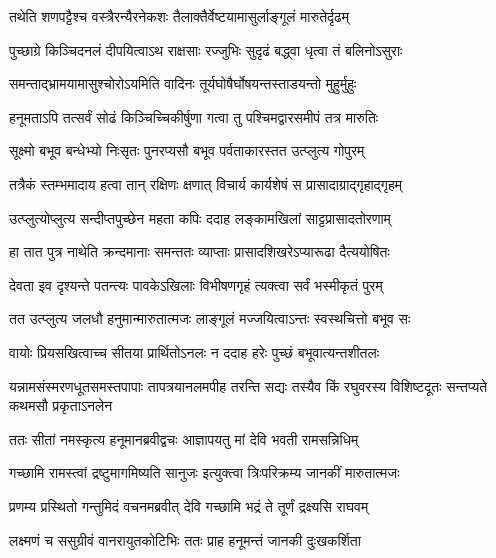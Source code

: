 \twolineshloka
{तथेति शणपट्टैश्च वस्त्रैरन्यैरनेकशः}
{तैलाक्तैर्वेष्टयामासुर्लाङ्गूलं मारुतेर्दृढम्} %

\twolineshloka
{पुच्छाग्रे किञ्चिदनलं दीपयित्वाऽथ राक्षसाः}
{रज्जुभिः सुदृढं बद्ध्वा धृत्वा तं बलिनोऽसुराः} %

\twolineshloka
{समन्ताद्भ्रामयामासुश्चोरोऽयमिति वादिनः}
{तूर्यघोषैर्घोषयन्तस्ताडयन्तो मुहुर्मुहुः} %

\twolineshloka
{हनूमताऽपि तत्सर्वं सोढं किञ्चिच्चिकीर्षुणा}
{गत्वा तु पश्चिमद्वारसमीपं तत्र मारुतिः} %

\twolineshloka
{सूक्ष्मो बभूव बन्धेभ्यो निःसृतः पुनरप्यसौ}
{बभूव पर्वताकारस्तत उत्प्लुत्य गोपुरम्} %

\twolineshloka
{तत्रैकं स्तम्भमादाय हत्वा तान् रक्षिणः क्षणात्}
{विचार्य कार्यशेषं स प्रासादाग्राद्गृहाद्गृहम्} %

\twolineshloka
{उत्प्लुत्योप्लुत्य सन्दीप्तपुच्छेन महता कपिः}
{ददाह लङ्कामखिलां साट्टप्रासादतोरणाम्} %

\twolineshloka
{हा तात पुत्र नाथेति क्रन्दमानाः समन्ततः}
{व्याप्ताः प्रासादशिखरेऽप्यारूढा दैत्ययोषितः} %

\twolineshloka
{देवता इव दृश्यन्ते पतन्त्यः पावकेऽखिलाः}
{विभीषणगृहं त्यक्त्वा सर्वं भस्मीकृतं पुरम्} %

\twolineshloka
{तत उत्प्लुत्य जलधौ हनुमान्मारुतात्मजः}
{लाङ्गूलं मज्जयित्वाऽन्तः स्वस्थचित्तो बभूव सः} %

\twolineshloka
{वायोः प्रियसखित्वाच्च सीतया प्रार्थितोऽनलः}
{न ददाह हरेः पुच्छं बभूवात्यन्तशीतलः} %

\fourlineindentedshloka
{यन्नामसंस्मरणधूतसमस्तपापाः}
{तापत्रयानलमपीह तरन्ति सद्यः}
{तस्यैव किं रघुवरस्य विशिष्टदूतः}
{सन्तप्यते कथमसौ प्रकृताऽनलेन} %






\twolineshloka
{ततः सीतां नमस्कृत्य हनूमानब्रवीद्वचः}
{आज्ञापयतु मां देवि भवती रामसन्निधिम्} %

\twolineshloka
{गच्छामि रामस्त्वां द्रष्टुमागमिष्यति सानुजः}
{इत्युक्त्वा त्रिःपरिक्रम्य जानकीं मारुतात्मजः} %

\twolineshloka
{प्रणम्य प्रस्थितो गन्तुमिदं वचनमब्रवीत्}
{देवि गच्छामि भद्रं ते तूर्णं द्रक्ष्यसि राघवम्} %

\twolineshloka
{लक्ष्मणं च ससुग्रीवं वानरायुतकोटिभिः}
{ततः प्राह हनूमन्तं जानकी दुःखकर्शिता} %

